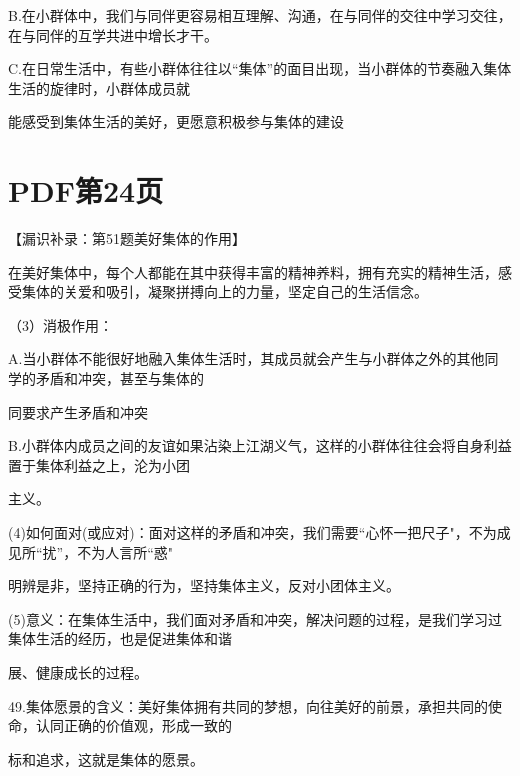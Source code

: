 \documentclass[lang=cn,11pt]{elegantbook}
\begin{document}
B.在小群体中，我们与同伴更容易相互理解、沟通，在与同伴的交往中学习交往，在与同伴的互学共进中增长才干。\par

C.在日常生活中，有些小群体往往以“集体”的面目出现，当小群体的节奏融入集体生活的旋律时，小群体成员就\par

能感受到集体生活的美好，更愿意积极参与集体的建设\par


\section*{PDF第24页}

【漏识补录：第51题美好集体的作用】\par

在美好集体中，每个人都能在其中获得丰富的精神养料，拥有充实的精神生活，感受集体的关爱和吸引，凝聚拼搏向上的力量，坚定自己的生活信念。\par

（3）消极作用：\par

A.当小群体不能很好地融入集体生活时，其成员就会产生与小群体之外的其他同学的矛盾和冲突，甚至与集体的\par

同要求产生矛盾和冲突\par

B.小群体内成员之间的友谊如果沾染上江湖义气，这样的小群体往往会将自身利益置于集体利益之上，沦为小团\par

主义。\par

(4)如何面对(或应对)：面对这样的矛盾和冲突，我们需要“心怀一把尺子"，不为成见所“扰”，不为人言所“惑"\par

明辨是非，坚持正确的行为，坚持集体主义，反对小团体主义。\par

(5)意义：在集体生活中，我们面对矛盾和冲突，解决问题的过程，是我们学习过集体生活的经历，也是促进集体和谐\par

展、健康成长的过程。\par

49.集体愿景的含义：美好集体拥有共同的梦想，向往美好的前景，承担共同的使命，认同正确的价值观，形成一致的\par

标和追求，这就是集体的愿景。\par
\end{document}
